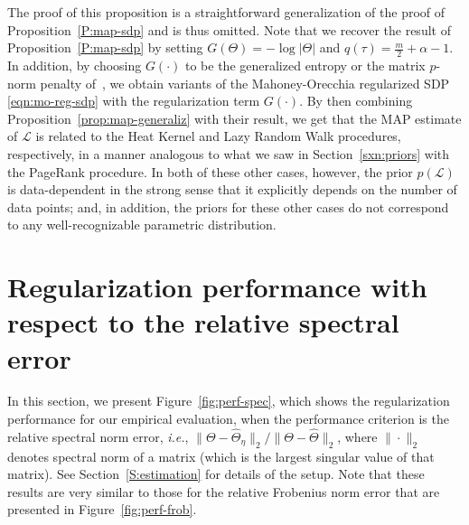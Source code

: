 The proof of this proposition is a straightforward generalization of the 
proof of Proposition~\ref{P:map-sdp} and is thus omitted.  
Note that we recover the result of Proposition~\ref{P:map-sdp} by setting
$G(\Theta) = - \log |\Theta|$ and $q(\tau) = \frac{m}{2} + \alpha - 1$.
In addition, by choosing $G(\cdot)$ to be the generalized entropy or the matrix 
$p$-norm penalty of~\cite{MO11-implementing}, we obtain variants of the 
Mahoney-Orecchia regularized SDP \eqref{eqn:mo-reg-sdp} with the 
regularization term $G(\cdot)$.
By then combining Proposition~\ref{prop:map-generaliz} with their result, we 
get that the MAP estimate of $\mathcal{L}$ is related to the Heat Kernel and 
Lazy Random Walk procedures, respectively, in a manner analogous to what we 
saw in Section~\ref{sxn:priors} with the PageRank procedure.
In both of these other cases, however, the prior $p(\mathcal{L})$ is 
data-dependent in the strong sense that it explicitly depends on the number 
of data points; and, in addition, the priors for these other cases do not 
correspond to any well-recognizable parametric distribution.






\vspace{-2mm}
\section{Regularization performance with respect to the relative spectral error}
\label{S:spectral-performance}
\vspace{-2mm}

In this section, we present Figure~\ref{fig:perf-spec}, which shows 
the regularization performance for our empirical evaluation, when the 
performance criterion is the relative spectral norm error, \emph{i.e.},
$\|\Theta - \hat \Theta_\eta\|_\mathrm{2} / \|\Theta - \hat \Theta
\|_\mathrm{2}$, where $\|\cdot\|_\mathrm{2}$ denotes spectral norm of a 
matrix (which is the largest singular value of that matrix).
See Section~\ref{S:estimation} for details of the setup.
Note that these results are very similar to those for the relative Frobenius 
norm error that are presented in Figure~\ref{fig:perf-frob}.


